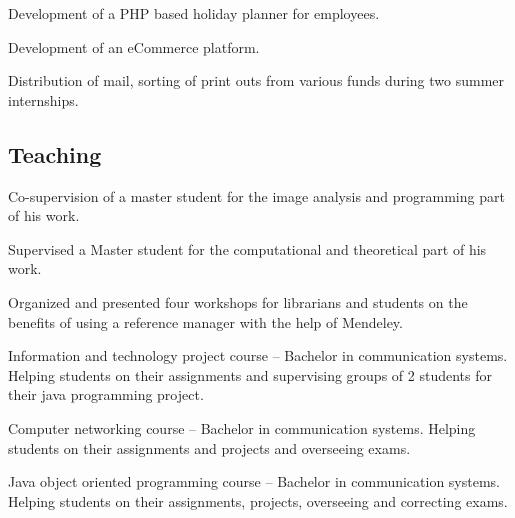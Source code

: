 \documentclass[11pt,a4paper,nolmodern,sans]{moderncv}        %
\begin{document}
{Development of a PHP based holiday planner for employees.}

{Development of an eCommerce platform.}

{Distribution of mail, sorting of print outs from various funds during two summer internships.}


\subsection{Teaching}

{Co-supervision of a master student for the image analysis and programming part of his work.
}

{Supervised a Master student for the computational and theoretical part of his work. }

{Organized and presented four workshops for librarians and students on the benefits of using a reference manager with the help of Mendeley.
}

{Information and technology project course -- Bachelor in communication systems. Helping students on their assignments and supervising groups of 2 students for their java programming project.}

{Computer networking course -- Bachelor in communication systems. Helping students on their assignments and projects and overseeing exams.}

{Java object oriented programming course -- Bachelor in communication systems. Helping students on their assignments, projects, overseeing and correcting exams.}{}
\end{document}
